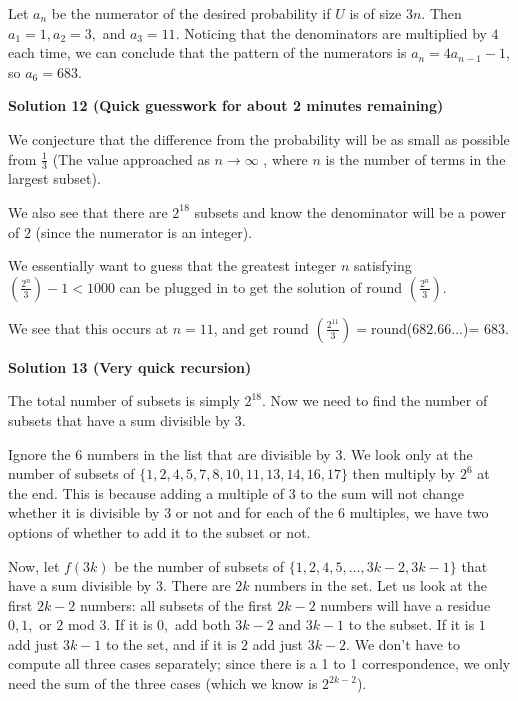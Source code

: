 \begin{enumerate}
 Let $a_n$ be the numerator of the desired probability if $U$ is of size $3n$. Then $a_1 = 1, a_2 = 3,$ and $a_3 = 11$. Noticing that the denominators are multiplied by $4$ each time, we can conclude that the pattern of the numerators is $a_n = 4a_{n-1} - 1$, so $a_6 = \boxed{683}$.

 



\textbf{Solution 12 (Quick guesswork for about 2 minutes remaining)}

We conjecture that the difference from the probability will be as small as possible from $\frac{1}{3}$ (The value approached as $n \rightarrow \infty$ , where $n$ is the number of terms in the largest subset).

 
We also see that there are $2^{18}$ subsets and know the denominator will be a power of $2$ (since the numerator is an integer).

 We essentially want to guess that the greatest integer $n$ satisfying $\left(\frac{2^n}{3}\right)-1 <1000$ can be plugged in to get the solution of round $\left( \frac{2^n}{3} \right)$.

 
We see that this occurs at $n=11$, and get round $\left( \frac{2^{11}}{3} \right)=$round($682.66...$)= $683$.

 



\textbf{Solution 13 (Very quick recursion)}

The total number of subsets is simply $2^{18}.$ Now we need to find the number of subsets that have a sum divisible by $3.$

 Ignore the 6 numbers in the list that are divisible by 3. We look only at the number of subsets of $\{1, 2, 4, 5, 7, 8, 10, 11, 13, 14, 16, 17\}$ then multiply by $2^6$ at the end. This is because adding a multiple of $3$ to the sum will not change whether it is divisible by $3$ or not and for each of the $6$ multiples, we have two options of whether to add it to the subset or not. 

 Now, let $f(3k)$ be the number of subsets of $\{1, 2, 4, 5, \dots, 3k-2, 3k-1\}$ that have a sum divisible by $3$. There are $2k$ numbers in the set. Let us look at the first $2k - 2$ numbers: all subsets of the first $2k - 2$ numbers will have a residue $0, 1,$ or $2$ mod $3.$ If it is $0,$ add both $3k-2$ and $3k-1$ to the subset. If it is $1$ add just $3k-1$ to the set, and if it is $2$ add just $3k-2.$  We don't have to compute all three cases separately; since there is a 1 to 1 correspondence, we only need the sum of the three cases (which we know is $2^{2k-2}$). 


\end{enumerate}
